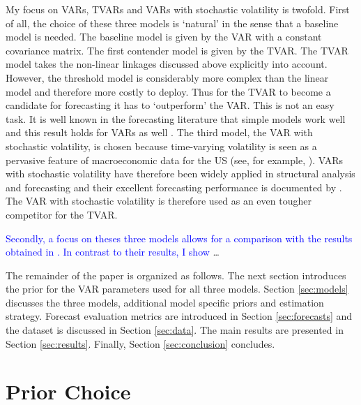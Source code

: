 \documentclass[12pt,letterpaper,fleqn]{article}           %
\begin{document}
My focus on VARs, TVARs and VARs with stochastic volatility is twofold. First of all, the choice of these three models is `natural' in the sense that a baseline model is needed. The baseline model is given by the VAR with a constant covariance matrix. The first contender model is given by the TVAR. The TVAR model takes the non-linear linkages discussed above explicitly into account. However, the threshold model is considerably more complex than the linear model and therefore more costly to deploy. %
Thus for the TVAR to become a candidate for forecasting it has to `outperform' the VAR. This is not an easy task. It is well known in the forecasting literature that simple models work well and this result holds for VARs as well \parencite{karlsson13}.%
The third model, the VAR with stochastic volatility, is chosen because time-varying volatility is seen as a pervasive feature of macroeconomic data for the US (see, for example, \cite{stock02}). 
VARs with stochastic volatility have therefore been widely applied in structural analysis and forecasting and their excellent forecasting performance is documented by \textcite{alessandri17, clark15, rav14}. The VAR with stochastic volatility is therefore used as an even tougher competitor for the TVAR.

\textcolor{blue}{Secondly, a focus on theses three models allows for a comparison with the results obtained in \textcite{alessandri17}. In contrast to their results, I show} \ldots %

The remainder of the paper is organized as follows. The next section introduces the prior for the VAR parameters used for all three models. Section \ref{sec:models} discusses the three models, additional model specific priors and estimation strategy. Forecast evaluation metrics are introduced in Section \ref{sec:forecasts} and the dataset is discussed in Section \ref{sec:data}. The main results are presented in Section \ref{sec:results}. Finally, Section \ref{sec:conclusion} concludes. %

\section{Prior Choice}
\label{sec:prior}
\end{document}
